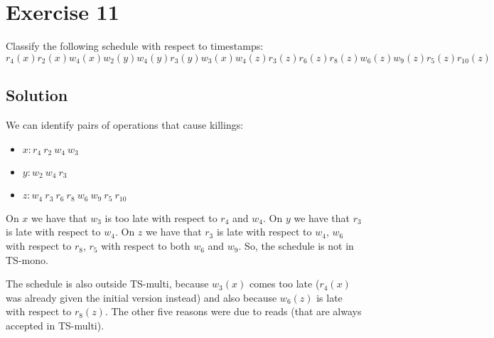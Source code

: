 \section{Exercise 11}

Classify the following schedule with respect to timestamps: 
\[r_4(x) r_2(x) w_4(x) w_2(y) w_4(y) r_3(y) w_3(x) w_4(z) r_3(z) r_6(z) r_8(z) w_6(z) w_9(z) r_5(z) r_{10}(z)\]

\subsection*{Solution}
We can identify pairs of operations that cause killings:
\begin{itemize}
    \item $x: r_4 \: r_2 \: w_4 \: w_3$
    \item $y: w_2 \: w_4 \: r_3$
    \item $z: w_4 \: r_3 \: r_6 \: r_8 \: w_6 \: w_9 \: r_5 \: r_{10}$
\end{itemize}
On $x$ we have that $w_3$ is too late with respect to $r_4$ and $w_4$. 
On $y$ we have that $r_3$ is late with respect to $w_4$. 
On $z$ we have that $r_3$ is late with respect to $w_4$, $w_6$ with respect to $r_8$, $r_5$ with respect to both $w_6$ and $w_9$. 
So, the schedule is not in TS-mono. 

The schedule is also outside TS-multi, because $w_3(x)$ comes too late ($r_4(x)$ was already given the initial version instead) and also because $w_6(z)$ is late with respect to $r_8(z)$. 
The other five reasons were due to reads (that are always accepted in TS-multi).